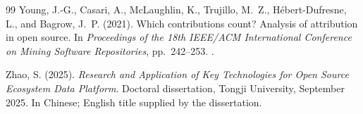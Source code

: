 \begin{thebibliography}{99}
Young, J.-G., Casari, A., McLaughlin, K., Trujillo, M.~Z., Hébert-Dufresne, L., and Bagrow, J.~P. (2021).
Which contributions count? Analysis of attribution in open source.
In \emph{Proceedings of the 18th IEEE/ACM International Conference on Mining Software Repositories}, pp.~242--253.
.

Zhao, S. (2025).
\emph{Research and Application of Key Technologies for Open Source Ecosystem Data Platform}.
Doctoral dissertation, Tongji University, September 2025. In Chinese; English title supplied by the dissertation.
\end{thebibliography}
\endgroup

